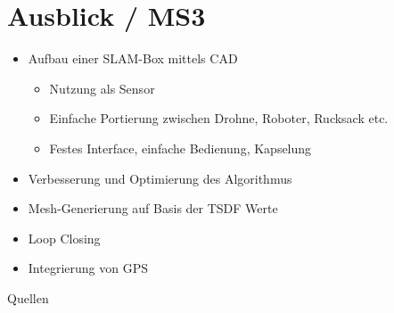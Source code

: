 \documentclass{beamer}
\begin{document}
\section{Ausblick / MS3}
\begin{frame}{\secname}
\begin{itemize}
\item{Aufbau einer SLAM-Box mittels CAD}
\begin{itemize}
\item{Nutzung als Sensor}
\item{Einfache Portierung zwischen Drohne, Roboter, Rucksack etc.}
\item{Festes Interface, einfache Bedienung, Kapselung}
\end{itemize}
\item{Verbesserung und Optimierung des Algorithmus}
\item{Mesh-Generierung auf Basis der TSDF Werte}
\item{Loop Closing}
\item{Integrierung von GPS}
\end{itemize}
\end{frame}

\begin{frame}{Quellen}
\printbibliography{}
\end{frame}
\end{document}
